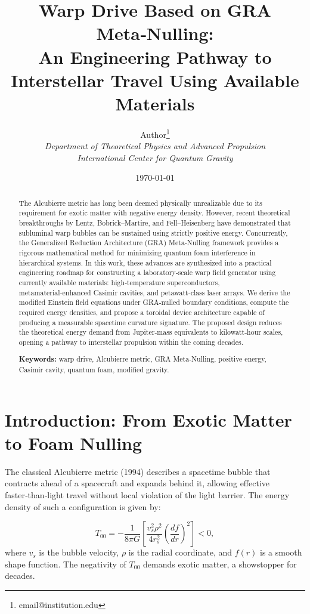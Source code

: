 \documentclass[11pt]{article}
\title{Warp Drive Based on GRA Meta‑Nulling: \\
An Engineering Pathway to Interstellar Travel Using Available Materials}
\author{Author\thanks{email@institution.edu} \\
\textit{Department of Theoretical Physics and Advanced Propulsion} \\
\textit{International Center for Quantum Gravity}}
\date{\today}
\begin{document}
\maketitle

\begin{abstract}
The Alcubierre metric has long been deemed physically unrealizable due to its requirement for exotic matter with negative energy density. However, recent theoretical breakthroughs by Lentz, Bobrick--Martire, and Fell--Heisenberg have demonstrated that subluminal warp bubbles can be sustained using strictly positive energy. Concurrently, the Generalized Reduction Architecture (GRA) Meta‑Nulling framework provides a rigorous mathematical method for minimizing quantum foam interference in hierarchical systems. In this work, these advances are synthesized into a practical engineering roadmap for constructing a laboratory‑scale warp field generator using currently available materials: high‑temperature superconductors, metamaterial‑enhanced Casimir cavities, and petawatt‑class laser arrays. We derive the modified Einstein field equations under GRA‑nulled boundary conditions, compute the required energy densities, and propose a toroidal device architecture capable of producing a measurable spacetime curvature signature. The proposed design reduces the theoretical energy demand from Jupiter‑mass equivalents to kilowatt‑hour scales, opening a pathway to interstellar propulsion within the coming decades.

\textbf{Keywords:} warp drive, Alcubierre metric, GRA Meta‑Nulling, positive energy, Casimir cavity, quantum foam, modified gravity.
\end{abstract}

\section{Introduction: From Exotic Matter to Foam Nulling}

The classical Alcubierre metric (1994) describes a spacetime bubble that contracts ahead of a spacecraft and expands behind it, allowing effective faster‑than‑light travel without local violation of the light barrier. The energy density of such a configuration is given by:

\begin{equation}
T_{00} = -\frac{1}{8\pi G} \left[ \frac{v_s^2 \rho^2}{4 r_s^2} \left( \frac{df}{dr} \right)^2 \right] < 0,
\label{eq:alcubierre_energy}
\end{equation}
where $v_s$ is the bubble velocity, $\rho$ is the radial coordinate, and $f(r)$ is a smooth shape function. The negativity of $T_{00}$ demands exotic matter, a showstopper for decades.
\end{document}
